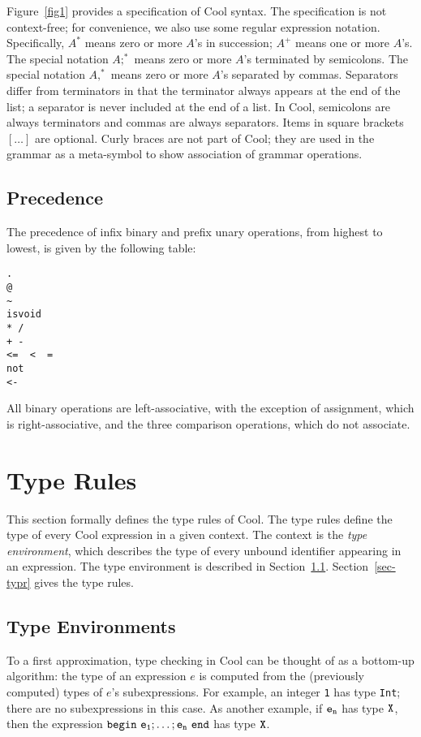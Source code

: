 Figure~\ref{fig1} provides a specification of Cool syntax.  The
specification is not context-free; for convenience, we also use some
regular expression notation.  Specifically, $A^{\ast}$ means zero or
more $A$'s in succession; $A^+$ means one or more $A$'s.  The special
notation $A;^{\ast}$ means zero or more $A$'s terminated by
semicolons.  The special notation $A,^{\ast}$ means zero or more $A$'s
separated by commas.  Separators differ from terminators in that the
terminator always appears at the end of the list; a separator is never
included at the end of a list.  In Cool, semicolons are always
terminators and commas are always separators.  Items in square brackets
$[\ldots]$ are optional.  Curly braces are not part of Cool; they are
used in the grammar as a meta-symbol to show association of grammar
operations.

\subsection{Precedence}
The precedence of infix binary and prefix unary operations, 
from highest to lowest, is given by
the following table:
\begin{verbatim}
.
@
~
isvoid
* /
+ -
<=  <  =
not
<-
\end{verbatim}
All binary operations are left-associative, with the exception of 
assignment, which is right-associative, and the three comparison operations,
which do not associate.

\section{Type Rules}
\label{sec-typrules}

This section formally defines the type rules of Cool.
The type rules define the type of every Cool expression 
in a given context.  The context is the {\em type environment},
which describes the type of every unbound identifier appearing in an
expression.  The type environment is described in Section~\ref{sec-typenv}.
Section~\ref{sec-typr} gives the type rules.

\subsection{Type Environments}
\label{sec-typenv}

To a first approximation, type checking in Cool can be thought of as
a bottom-up algorithm: the type of an expression $e$ is computed from the
(previously computed) types of $e$'s subexpressions.  For example,
an integer {\tt 1} has type {\tt Int}; there are no subexpressions in
this case.  As another example, if $\tt e_n$ has type $\tt X$, then
the expression $\tt \mbox{\tt begin}\ e_1; \ldots; e_n\ \mbox{\tt end}$ has 
type $\tt X$.

